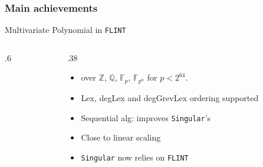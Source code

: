 \begin{frame}
\frametitle{Main achievements}


  \begin{block}{Multivariate Polynomial  in \texttt{FLINT}}
    \begin{columns}
      \begin{column}   {.6\textwidth}
        \vspace{1em}
        \noindent
        \only<1>{}
        \only<2>{}
        \only<3>{}
      \end{column}
      \begin{column}   {.38\textwidth}
        \begin{itemize}
     \item over $\mathbb{Z}$, $\mathbb{Q}$, $\mathbb{F}_p$, $\mathbb{F}_{p^n}$ for $p < 2^{64}$.
     \item Lex, degLex and degGrevLex ordering supported
       \item Sequential alg: improves \texttt{Singular}'s
       \item Close to linear scaling
       \item \texttt{Singular} now relies on \texttt{FLINT}
        \end{itemize}
      \end{column}
    \end{columns}
  \end{block}

\end{frame}


